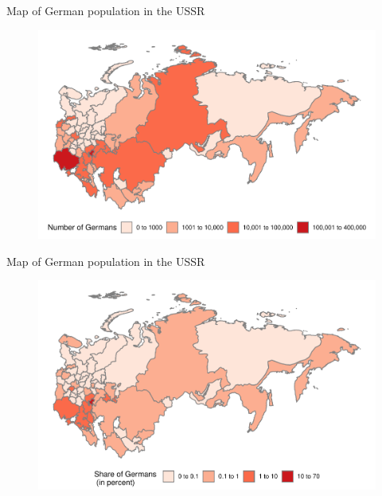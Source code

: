 \documentclass[11pt]{beamer}
\begin{document}
\begin{frame}[label=map_counts]{Map of German population in the USSR}
 \begin{figure}[h]
\centering
\includegraphics[width=1\textwidth]{map_number_of_germans_discrete.pdf}
\end{figure}
\hyperlink{add_content}{}
\end{frame}

\begin{frame}[label=map_share]{Map of German population in the USSR}
 \begin{figure}[h]
\centering
\includegraphics[width=1\textwidth]{map_share_of_germans_discrete.pdf}
\end{figure}
\hyperlink{add_content}{}
\end{frame}
\end{document}
